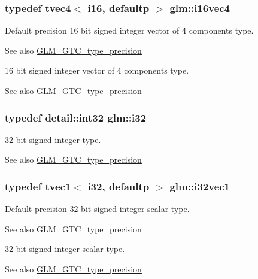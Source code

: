 \subsubsection[{i16vec4}]{\setlength{\rightskip}{0pt plus 5cm}typedef tvec4$<$ i16, defaultp $>$ {\bf glm\+::i16vec4}}\label{group__gtc__type__precision_gaf074450c0e60b45114084b1df4012a1d}
Default precision 16 bit signed integer vector of 4 components type. \begin{DoxySeeAlso}{See also}
\hyperlink{group__gtc__type__precision}{G\+L\+M\+\_\+\+G\+T\+C\+\_\+type\+\_\+precision}
\end{DoxySeeAlso}
16 bit signed integer vector of 4 components type. \begin{DoxySeeAlso}{See also}
\hyperlink{group__gtc__type__precision}{G\+L\+M\+\_\+\+G\+T\+C\+\_\+type\+\_\+precision} 
\end{DoxySeeAlso}
\hypertarget{group__gtc__type__precision_ga1d8ed5c43e91ea7d4528389da4fa9524}{}
\subsubsection[{i32}]{\setlength{\rightskip}{0pt plus 5cm}typedef {\bf detail\+::int32} {\bf glm\+::i32}}\label{group__gtc__type__precision_ga1d8ed5c43e91ea7d4528389da4fa9524}
32 bit signed integer type. \begin{DoxySeeAlso}{See also}
\hyperlink{group__gtc__type__precision}{G\+L\+M\+\_\+\+G\+T\+C\+\_\+type\+\_\+precision} 
\end{DoxySeeAlso}
\hypertarget{group__gtc__type__precision_ga05a766bbe2ad0791ed0081baac492da7}{}
\subsubsection[{i32vec1}]{\setlength{\rightskip}{0pt plus 5cm}typedef tvec1$<$ i32, defaultp $>$ {\bf glm\+::i32vec1}}\label{group__gtc__type__precision_ga05a766bbe2ad0791ed0081baac492da7}
Default precision 32 bit signed integer scalar type. \begin{DoxySeeAlso}{See also}
\hyperlink{group__gtc__type__precision}{G\+L\+M\+\_\+\+G\+T\+C\+\_\+type\+\_\+precision}
\end{DoxySeeAlso}
32 bit signed integer scalar type. \begin{DoxySeeAlso}{See also}
\hyperlink{group__gtc__type__precision}{G\+L\+M\+\_\+\+G\+T\+C\+\_\+type\+\_\+precision} 
\end{DoxySeeAlso}
\hypertarget{group__gtc__type__precision_ga25820e641988fe33b075d80434872d02}{}
